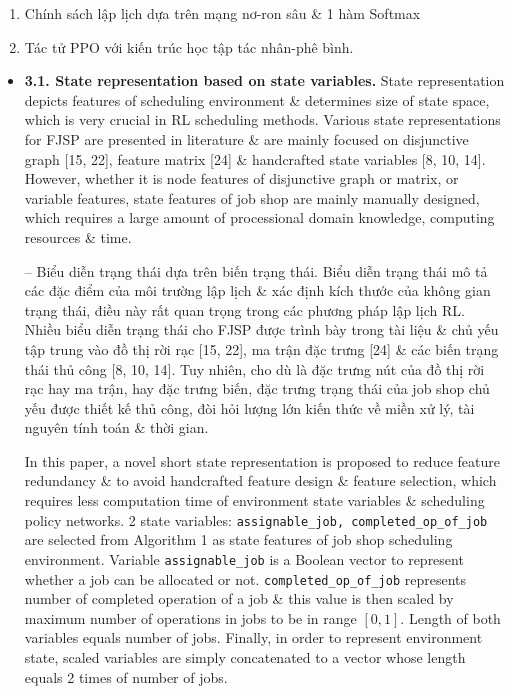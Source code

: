 \documentclass{article}
\begin{document}
\begin{itemize}
\begin{enumerate}
        \item Chính sách lập lịch dựa trên mạng nơ-ron sâu \& 1 hàm Softmax
        \item Tác tử PPO với kiến trúc học tập tác nhân-phê bình.
    \end{enumerate}
    \begin{itemize}
        \item {\bf3.1. State representation based on state variables.} State representation depicts features of scheduling environment \& determines size of state space, which is very crucial in RL scheduling methods. Various state representations for FJSP are presented in literature \& are mainly focused on disjunctive graph [15, 22], feature matrix [24] \& handcrafted state variables [8, 10, 14]. However, whether it is node features of disjunctive graph or matrix, or variable features, state features of job shop are mainly manually designed, which requires a large amount of processional domain knowledge, computing resources \& time.

        -- {\sf Biểu diễn trạng thái dựa trên biến trạng thái.} Biểu diễn trạng thái mô tả các đặc điểm của môi trường lập lịch \& xác định kích thước của không gian trạng thái, điều này rất quan trọng trong các phương pháp lập lịch RL. Nhiều biểu diễn trạng thái cho FJSP được trình bày trong tài liệu \& chủ yếu tập trung vào đồ thị rời rạc [15, 22], ma trận đặc trưng [24] \& các biến trạng thái thủ công [8, 10, 14]. Tuy nhiên, cho dù là đặc trưng nút của đồ thị rời rạc hay ma trận, hay đặc trưng biến, đặc trưng trạng thái của job shop chủ yếu được thiết kế thủ công, đòi hỏi lượng lớn kiến thức về miền xử lý, tài nguyên tính toán \& thời gian.

        In this paper, a novel short state representation is proposed to reduce feature redundancy \& to avoid handcrafted feature design \& feature selection, which requires less computation time of environment state variables \& scheduling policy networks. 2 state variables: \verb|assignable_job, completed_op_of_job| are selected from Algorithm 1 as state features of job shop scheduling environment. Variable \verb|assignable_job| is a Boolean vector to represent whether a job can be allocated or not. \verb|completed_op_of_job| represents number of completed operation of a job \& this value is then scaled by maximum number of operations in jobs to be in range $[0,1]$. Length of both variables equals number of jobs. Finally, in order to represent environment state, scaled variables are simply concatenated to a vector whose length equals 2 times of number of jobs.


\end{itemize}
\end{itemize}
\end{document}
